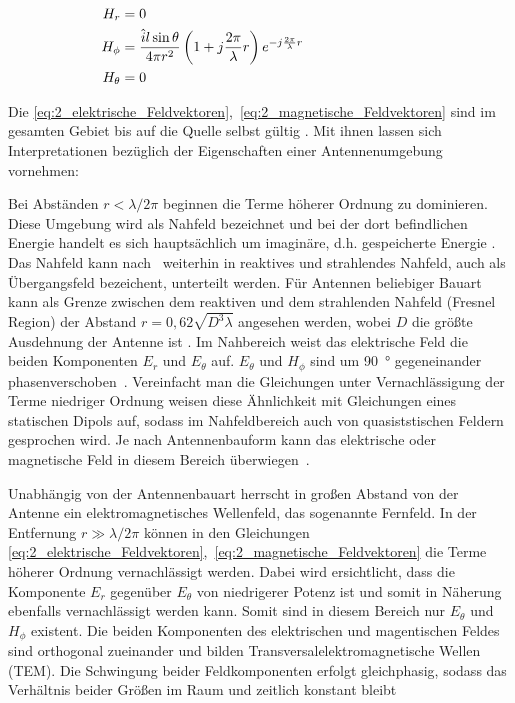 \begin{subequations}
\label{eq:2_magnetische_Feldvektoren}
    \begin{align}
        H_r &= 0 \hphantom{\text{DiesIstEinLangesPlatzhalterwort1111111111}} \label{subeq:2_H-Feld1}\\
        H_{\phi} &= \frac{\hat i l \sin{\theta}}{4 \pi r^2}\left(1+j\frac{2\pi}{\lambda}r\right)e^{-j\frac{2\pi}{\lambda}r} \label{subeq:2_H-Feld2}\\
        H_{\theta} &= 0
    \end{align}
\end{subequations}

Die \Gleichungen \eqref{eq:2_elektrische_Feldvektoren},~\eqref{eq:2_magnetische_Feldvektoren} sind im gesamten Gebiet bis auf die Quelle selbst gültig \cite{Antenna_Theory}. Mit ihnen lassen sich Interpretationen bezüglich der Eigenschaften einer Antennenumgebung vornehmen:
\par
\vspace{\linespace}
Bei Abständen $r< \lambda / 2\pi$ beginnen die Terme höherer Ordnung zu dominieren. Diese Umgebung wird als Nahfeld bezeichnet und bei der dort befindlichen Energie handelt es sich hauptsächlich um imaginäre, d.h. gespeicherte Energie \cite{Antenna_Theory}. Das Nahfeld kann nach~\cite{Bundesnetzagentur_Glossar_Nahfeld} weiterhin in reaktives und strahlendes Nahfeld, auch als Übergangsfeld bezeichent, unterteilt werden. Für Antennen beliebiger Bauart kann als Grenze zwischen dem reaktiven und dem strahlenden Nahfeld (Fresnel Region) der Abstand $r=0,62 \sqrt{D^3\lambda}$ angesehen werden, wobei $D$ die größte Ausdehnung der Antenne ist \cite{Antenna_Theory}. Im Nahbereich weist das elektrische Feld die beiden Komponenten $E_r$ und $E_{\theta}$ auf. $E_\theta$ und $H_\phi$ sind um \SI{90}{\degree} gegeneinander phasenverschoben~\cite{EM_Schirmung}. Vereinfacht man die Gleichungen unter Vernachlässigung der Terme niedriger Ordnung weisen diese Ähnlichkeit mit Gleichungen eines statischen Dipols auf, sodass im Nahfeldbereich auch von quasiststischen Feldern gesprochen wird. Je nach Antennenbauform kann das elektrische oder magnetische Feld in diesem Bereich überwiegen~\cite{EMV}. 
\par
\vspace{\linespace}
Unabhängig von der Antennenbauart herrscht in großen Abstand von der Antenne ein elektromagnetisches Wellenfeld, das sogenannte Fernfeld. In der Entfernung $r\gg \lambda / 2\pi$ können in den Gleichungen \eqref{eq:2_elektrische_Feldvektoren},~\eqref{eq:2_magnetische_Feldvektoren} die Terme höherer Ordnung vernachlässigt werden. Dabei wird ersichtlicht, dass die Komponente $E_r$ gegenüber $E_\theta$ von niedrigerer Potenz ist und somit in Näherung ebenfalls vernachlässigt werden kann. Somit sind in diesem Bereich nur $E_\theta$ und $H_\phi$ existent. Die beiden Komponenten des elektrischen und magentischen Feldes sind orthogonal zueinander und bilden Transversalelektromagnetische Wellen (TEM). Die Schwingung beider Feldkomponenten erfolgt gleichphasig, sodass das Verhältnis beider Größen im Raum und zeitlich konstant bleibt \cite{EMV}

